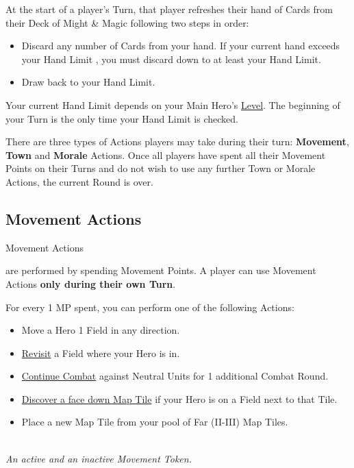 
\begin{multicols}{2}

At the start of a player's Turn, that player refreshes their hand of Cards from their Deck of Might \& Magic following two steps in order:
\begin{itemize}
  \item Discard any number of Cards from your hand.
If your current hand exceeds your Hand Limit , you must discard down to at least your Hand Limit.
  \item Draw back to your Hand Limit.
\end{itemize}
Your current Hand Limit depends on your Main Hero's \hyperlink{Level}{Level}.
The beginning of your Turn is the only time your Hand Limit is checked.\par
There are three types of Actions players may take during their turn: \textbf{Movement}, \textbf{Town} and \textbf{Morale} Actions.
Once all players have spent all their Movement Points on their Turns and do not wish to use any further Town or Morale Actions, the current Round is over.
\subsection*{Movement Actions}
\hypertarget{Movement}{Movement Actions} are performed by spending Movement Points.
A player can use Movement Actions \textbf{only during their own Turn}.\par
For every 1 MP spent, you can perform one of the following Actions:
\begin{itemize}
  \item Move a Hero 1 Field in any direction.
  \item \hyperlink{Categories}{Revisit} a Field where your Hero is in.
  \item \hyperlink{Timelimit}{Continue Combat} against Neutral Units for 1 additional Combat Round.
  \item \hyperlink{Placing}{Discover a face down Map Tile} if your Hero is on a Field next to that Tile.
  \item Place a new Map Tile from your pool of Far (II-III) Map Tiles.
\end{itemize}

\begin{center}
  \\
  \medskip
  \footnotesize\textit{An active and an inactive Movement Token.}
\end{center}


\end{multicols}
